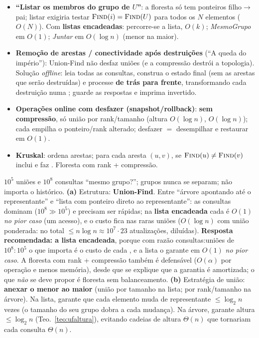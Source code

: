 \begin{prova}
\begin{itemize}
  \item \textbf{``Listar os membros do grupo de $U$''}: a floresta só tem ponteiros filho$\to$pai; listar exigiria testar $\textsc{Find}(i)=\textsc{Find}(U)$ para todos os $N$ elementos ($O(N)$). Com \textbf{listas encadeadas}: percorre-se a lista, $O(k)$; \emph{MesmoGrupo} em $O(1)$; \emph{Juntar} em $O(\log n)$\am{} (menor na maior).
  \item \textbf{Remoção de arestas / conectividade após destruições} (``A queda do império''): Union-Find não desfaz uniões (e a compressão destrói a topologia). Solução \emph{offline}: leia todas as consultas, construa o estado final (sem as arestas que serão destruídas) e processe \textbf{de trás para frente}, transformando cada destruição numa \Union; guarde as respostas e imprima invertido.
  \item \textbf{Operações online com desfazer (snapshot/rollback)}: \textbf{sem compressão}, só união por rank/tamanho (altura $O(\log n)$, \Find{} $O(\log n)$); cada \Union{} empilha o ponteiro/rank alterado; desfazer $=$ desempilhar e restaurar em $O(1)$.
  \item \textbf{Kruskal}: ordena arestas; para cada aresta $(u,v)$, se $\textsc{Find}(u)\ne\textsc{Find}(v)$ inclui e faz \Union. Floresta com rank + compressão.
\end{itemize}
\end{prova}

\begin{prova}
$10^5$ uniões e $10^8$ consultas ``mesmo grupo?''; grupos nunca se separam; não importa o histórico.
\textbf{(a)} Estrutura: \textbf{Union-Find}. Entre ``árvore apontando até o representante'' e ``lista com ponteiro direto ao representante'': as consultas dominam ($10^8\gg10^5$) e precisam ser rápidas; na \textbf{lista encadeada} cada \Find{} é $O(1)$ \emph{no pior caso} (um acesso), e o custo fica nas raras uniões ($O(\log n)$\am{} com união ponderada: no total $\le n\log n\approx 10^7\cdot 23$ atualizações, diluídas). \textbf{Resposta recomendada: a lista encadeada}, porque com razão consultas:uniões de $10^8:10^5$ o que importa é o custo de cada \Find, e a lista o garante em $O(1)$ \emph{no pior caso}. A floresta com rank + compressão também é defensável ($O(\alpha)$\am{} por operação e menos memória), desde que se explique que a garantia é amortizada; o que \emph{não} se deve propor é floresta sem balanceamento.
\textbf{(b)} Estratégia de união: \textbf{anexar o menor ao maior} (união por tamanho na lista; por rank/tamanho na árvore). Na lista, garante que cada elemento muda de representante $\le\log_2 n$ vezes (o tamanho do seu grupo dobra a cada mudança). Na árvore, garante altura $\le\log_2 n$ (Teo.~\ref{teo:ufaltura}), evitando cadeias de altura $\Theta(n)$ que tornariam cada consulta $\Theta(n)$.
\end{prova}

